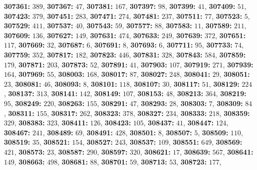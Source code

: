 \textsf{\bfseries 307361:} $389$, \textsf{\bfseries 307367:} $47$, \textsf{\bfseries 307381:} $167$, \textsf{\bfseries 307397:} $98$, \textsf{\bfseries 307399:} $41$, \textsf{\bfseries 307409:} $51$, \textsf{\bfseries 307423:} $379$, \textsf{\bfseries 307451:} $283$, \textsf{\bfseries 307471:} $274$, \textsf{\bfseries 307481:} $237$, \textsf{\bfseries 307511:} $77$, \textsf{\bfseries 307523:} $5$, \textsf{\bfseries 307529:} $411$, \textsf{\bfseries 307537:} $40$, \textsf{\bfseries 307543:} $59$, \textsf{\bfseries 307577:} $88$, \textsf{\bfseries 307583:} $11$, \textsf{\bfseries 307589:} $211$, \textsf{\bfseries 307609:} $136$, \textsf{\bfseries 307627:} $149$, \textsf{\bfseries 307631:} $474$, \textsf{\bfseries 307633:} $249$, \textsf{\bfseries 307639:} $372$, \textsf{\bfseries 307651:} $117$, \textsf{\bfseries 307669:} $32$, \textsf{\bfseries 307687:} $6$, \textsf{\bfseries 307691:} $8$, \textsf{\bfseries 307693:} $6$, \textsf{\bfseries 307711:} $95$, \textsf{\bfseries 307733:} $74$, \textsf{\bfseries 307759:} $352$, \textsf{\bfseries 307817:} $182$, \textsf{\bfseries 307823:} $446$, \textsf{\bfseries 307831:} $328$, \textsf{\bfseries 307843:} $584$, \textsf{\bfseries 307859:} $179$, \textsf{\bfseries 307871:} $203$, \textsf{\bfseries 307873:} $52$, \textsf{\bfseries 307891:} $41$, \textsf{\bfseries 307903:} $107$, \textsf{\bfseries 307919:} $271$, \textsf{\bfseries 307939:} $164$, \textsf{\bfseries 307969:} $55$, \textsf{\bfseries 308003:} $168$, \textsf{\bfseries 308017:} $87$, \textsf{\bfseries 308027:} $248$, \textsf{\bfseries 308041:} $29$, \textsf{\bfseries 308051:} $23$, \textsf{\bfseries 308081:} $46$, \textsf{\bfseries 308093:} $8$, \textsf{\bfseries 308101:} $118$, \textsf{\bfseries 308107:} $30$, \textsf{\bfseries 308117:} $51$, \textsf{\bfseries 308129:} $224$, \textsf{\bfseries 308137:} $313$, \textsf{\bfseries 308141:} $142$, \textsf{\bfseries 308149:} $107$, \textsf{\bfseries 308153:} $48$, \textsf{\bfseries 308213:} $364$, \textsf{\bfseries 308219:} $95$, \textsf{\bfseries 308249:} $220$, \textsf{\bfseries 308263:} $155$, \textsf{\bfseries 308291:} $47$, \textsf{\bfseries 308293:} $28$, \textsf{\bfseries 308303:} $7$, \textsf{\bfseries 308309:} $84$, \textsf{\bfseries 308311:} $155$, \textsf{\bfseries 308317:} $262$, \textsf{\bfseries 308323:} $378$, \textsf{\bfseries 308327:} $234$, \textsf{\bfseries 308333:} $218$, \textsf{\bfseries 308359:} $329$, \textsf{\bfseries 308383:} $323$, \textsf{\bfseries 308411:} $126$, \textsf{\bfseries 308423:} $105$, \textsf{\bfseries 308437:} $41$, \textsf{\bfseries 308447:} $124$, \textsf{\bfseries 308467:} $241$, \textsf{\bfseries 308489:} $69$, \textsf{\bfseries 308491:} $428$, \textsf{\bfseries 308501:} $8$, \textsf{\bfseries 308507:} $5$, \textsf{\bfseries 308509:} $110$, \textsf{\bfseries 308519:} $35$, \textsf{\bfseries 308521:} $154$, \textsf{\bfseries 308527:} $243$, \textsf{\bfseries 308537:} $109$, \textsf{\bfseries 308551:} $649$, \textsf{\bfseries 308569:} $421$, \textsf{\bfseries 308573:} $23$, \textsf{\bfseries 308587:} $290$, \textsf{\bfseries 308597:} $320$, \textsf{\bfseries 308621:} $17$, \textsf{\bfseries 308639:} $567$, \textsf{\bfseries 308641:} $149$, \textsf{\bfseries 308663:} $498$, \textsf{\bfseries 308681:} $88$, \textsf{\bfseries 308701:} $59$, \textsf{\bfseries 308713:} $53$, \textsf{\bfseries 308723:} $177$, 
